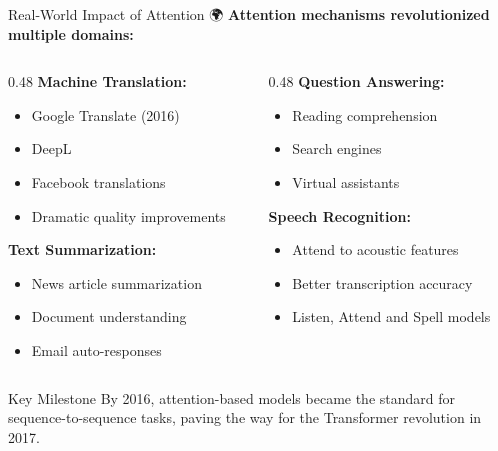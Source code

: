 \documentclass[aspectratio=169]{beamer}
\begin{document}
\begin{frame}[shrink=10]{Real-World Impact of Attention 🌍}
\small
\textbf{Attention mechanisms revolutionized multiple domains:}

\vspace{1em}

\begin{columns}[T]
\begin{column}{0.48\textwidth}
\textbf{Machine Translation:}
\begin{itemize}\setlength{\itemsep}{0pt}
    \item Google Translate (2016)
    \item DeepL
    \item Facebook translations
    \item Dramatic quality improvements
\end{itemize}

\vspace{0.5em}

\textbf{Text Summarization:}
\begin{itemize}\setlength{\itemsep}{0pt}
    \item News article summarization
    \item Document understanding
    \item Email auto-responses
\end{itemize}
\end{column}

\begin{column}{0.48\textwidth}
\textbf{Question Answering:}
\begin{itemize}\setlength{\itemsep}{0pt}
    \item Reading comprehension
    \item Search engines
    \item Virtual assistants
\end{itemize}

\vspace{0.5em}

\textbf{Speech Recognition:}
\begin{itemize}\setlength{\itemsep}{0pt}
    \item Attend to acoustic features
    \item Better transcription accuracy
    \item Listen, Attend and Spell models
\end{itemize}
\end{column}
\end{columns}

\vspace{1em}

\begin{block}{Key Milestone}
By 2016, attention-based models became the standard for sequence-to-sequence tasks, paving the way for the Transformer revolution in 2017.
\end{block}
\end{frame}
\end{document}
